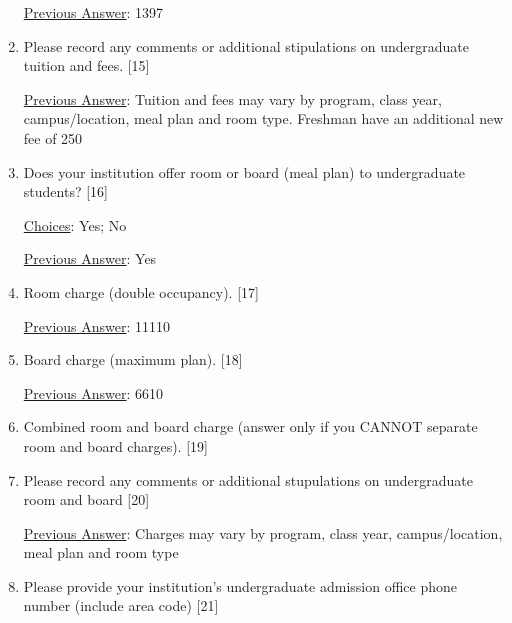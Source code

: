 \documentclass[12 pt, a4paper]{article}
\begin{document}
\begin{Form}
\begin{enumerate}
\underline{Previous Answer}: 1397\medskip

\TextField[width = 6 in,multiline, name=90017]{} \medskip

\item Please record any comments or additional stipulations on undergraduate tuition and fees. [15] \medskip

\underline{Previous Answer}: Tuition and fees may vary by program, class year, campus/location, meal plan and room type. Freshman have an additional new fee of 250\medskip

\TextField[width = 6 in,multiline, name=90018]{} \medskip

\item Does your institution offer room or board (meal plan) to undergraduate students? [16] \medskip

\underline{Choices}: Yes; No \medskip

\underline{Previous Answer}: Yes\medskip

\TextField[width = 6 in,multiline, name=90019]{} \medskip

\item Room charge (double occupancy). [17] \medskip

\underline{Previous Answer}: 11110\medskip

\TextField[width = 6 in,multiline, name=90020]{} \medskip

\item Board charge (maximum plan). [18] \medskip

\underline{Previous Answer}: 6610\medskip

\TextField[width = 6 in,multiline, name=90021]{} \medskip

\item Combined room and board charge (answer only if you CANNOT separate room and board charges). [19] \medskip

\TextField[width = 6 in,multiline, name=90022]{} \medskip

\item Please record any comments or additional stupulations on undergraduate room and board [20] \medskip

\underline{Previous Answer}: Charges may vary by program, class year, campus/location, meal plan and room type\medskip

\TextField[width = 6 in,multiline, name=90023]{} \medskip

\item Please provide your institution's undergraduate admission office phone number (include area code) [21] \medskip


\end{enumerate}
\end{Form}
\end{document}
